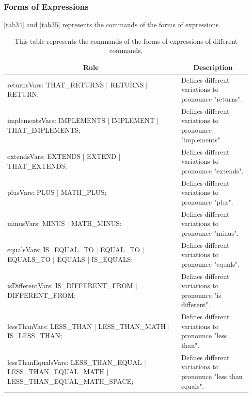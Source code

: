 \subsubsection{Forms of Expressions}
\autoref{tab34} and \autoref{tab35} represents the commands of the forms of expressions.

\begin{table}[H]
	\centering
	\begin{tabular}{|p{8cm}|p{7cm}|}
		\hline
		\multicolumn{1}{|c|}{{\bf Rule}} & \multicolumn{1}{c|}{{\bf Description}} \\ \hline
		returnsVars: THAT\_RETURNS | RETURNS | RETURN; & Defines different variations to pronounce "returns". \\ \hline
		implementsVars: IMPLEMENTS | IMPLEMENT | THAT\_IMPLEMENTS; & Defines different variations to pronounce "implements". \\ \hline
		extendsVars: EXTENDS | EXTEND | THAT\_EXTENDS; & Defines different variations to pronounce "extends". \\ \hline
		plusVars: PLUS | MATH\_PLUS; & Defines different variations to pronounce "plus". \\ \hline
		minusVars: MINUS | MATH\_MINUS; & Defines different variations to pronounce "minus". \\ \hline
		equalsVars: IS\_EQUAL\_TO | EQUAL\_TO | EQUALS\_TO | EQUALS | IS\_EQUALS; & Defines different variations to pronounce "equals". \\ \hline
		isDifferentVars: IS\_DIFFERENT\_FROM | DIFFERENT\_FROM; & Defines different variations to pronounce "is different". \\ \hline
		lessThanVars: LESS\_THAN | LESS\_THAN\_MATH | IS\_LESS\_THAN; & Defines different variations to pronounce "less than". \\ \hline
		lessThanEqualsVars: LESS\_THAN\_EQUAL | LESS\_THAN\_EQUAL\_MATH | LESS\_THAN\_EQUAL\_MATH\_SPACE; & Defines different variations to pronounce "less than equals". \\ \hline
	\end{tabular}
		\caption{This table represents the commands of the forms of expressions of different commands.}
		\label{tab34}
\end{table}

